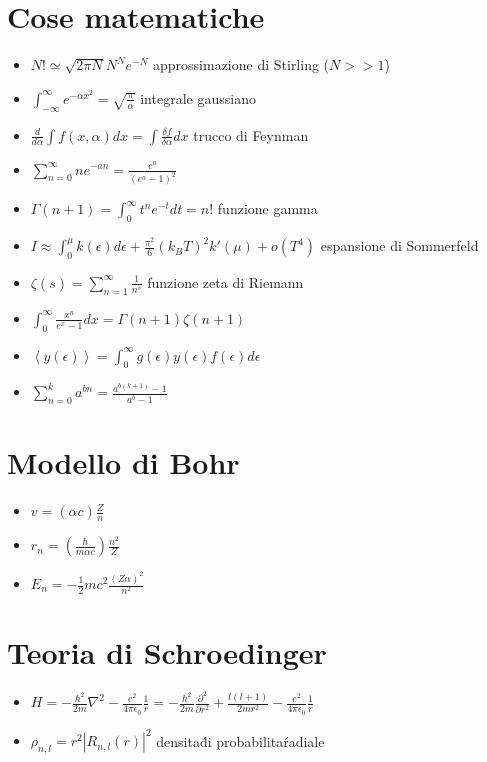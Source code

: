 \documentclass[a4paper]{article}
\begin{document}
    \section{Cose matematiche}
        \begin{itemize}
            \item $N!\simeq\sqrt{2\pi N}N^Ne^{-N}$ approssimazione di Stirling ($N>>1$)
            \item $\int_{-\infty}^{\infty}e^{-\alpha x^2}=\sqrt{\frac{\pi}{\alpha}}$ integrale gaussiano
            \item $\frac{d}{d\alpha}\int f(x,\alpha)dx=\int\frac{\delta f}{\delta\alpha}dx$ trucco di Feynman
            \item $\sum_{n=0}^\infty ne^{-an}=\frac{e^a}{(e^a-1)^2}$
            \item $\Gamma(n+1)=\int_0^\infty t^{n}e^{-t}dt=n!$ funzione gamma
            \item $I\approx\int_0^\mu k(\epsilon)d\epsilon+\frac{\pi^2}{6}(k_BT)^2k'(\mu)+o(T^4)$ espansione di Sommerfeld
            \item $\zeta(s)=\sum_{n=1}^\infty\frac{1}{n^s}$ funzione zeta di Riemann
            \item $\int_0^\infty\frac{x^n}{e^x-1}dx=\Gamma(n+1)\zeta(n+1)$
            \item $\left\langle y(\epsilon) \right\rangle=\int_0^\infty g(\epsilon)y(\epsilon)f(\epsilon)d\epsilon$
            \item $\sum_{n=0}^{k}a^{bn}=\frac{a^{b(k+1)}-1}{a^b-1}$
        \end{itemize}
    \newpage
    \section{Modello di Bohr}
        \begin{itemize}
            \item $v=\left(\alpha c\right)\frac{Z}{n}$
            \item $r_{n}=\left(\frac{\hbar}{m\alpha c}\right)\frac{n^2}{Z}$
            \item $E_n=-\frac{1}{2}mc^2\frac{\left(Z\alpha\right)^2}{n^2}$
        \end{itemize}
    \section{Teoria di Schroedinger}
        \begin{itemize}
            \item $H=-\frac{\hbar^2}{2m}\nabla^2-\frac{e^2}{4\pi\epsilon_0}\frac{1}{r}=-\frac{\hbar^2}{2m}\frac{\partial^2}{\partial r^2}+\frac{l(l+1)}{2mr^2}-\frac{e^2}{4\pi\epsilon_0}\frac{1}{r}$
            \item $\rho_{n,l}=r^2\left\lvert R_{n,l}(r) \right\rvert^2$ densita\' di probabilita\' radiale 
        \end{itemize}
\end{document}
